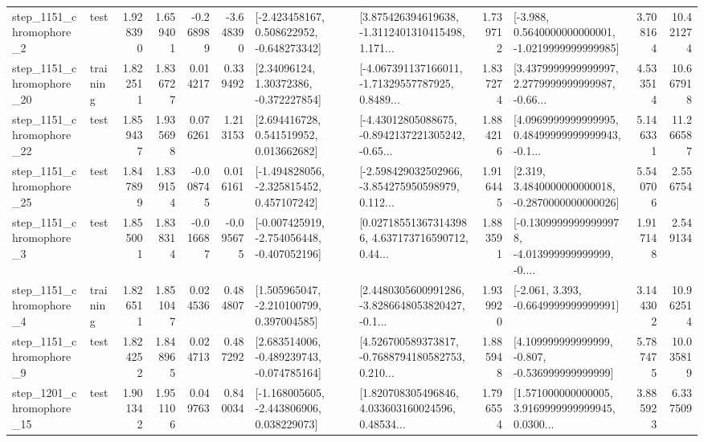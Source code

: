 \begin{tabular}{llrrrrllrlrr}
  step\_1151\_chromophore\_2 &      test &      1.928390 &    1.659401 &     -0.268989 & -3.648390 &   [-2.423458167, 0.508622952, -0.648273342] &  [3.875426394619638, -1.3112401310415498, 1.171... &       1.739712 &  [-3.988, 0.5640000000000001, -1.0219999999999985] &            3.708164 &         10.421274 \\
 step\_1151\_chromophore\_20 &  training &      1.822511 &    1.836727 &      0.014217 &  0.339492 &      [2.34096124, 1.30372386, -0.372227854] &  [-4.067391137166011, -1.71329557787925, 0.8489... &       1.837274 &  [3.4379999999999997, 2.2779999999999987, -0.66... &            4.533514 &         10.667918 \\
 step\_1151\_chromophore\_22 &      test &      1.859437 &    1.935698 &      0.076261 &  1.213153 &     [2.694416728, 0.541519952, 0.013662682] &  [-4.43012805088675, -0.8942137221305242, -0.65... &       1.884216 &  [4.0969999999999995, 0.48499999999999943, -0.1... &            5.146331 &         11.266587 \\
 step\_1151\_chromophore\_25 &      test &      1.847899 &    1.839154 &     -0.008745 &  0.016161 &   [-1.494828056, -2.325815452, 0.457107242] &  [-2.598429032502966, -3.854275950598979, 0.112... &       1.916445 &   [2.319, 3.4840000000000018, -0.2870000000000026] &            5.540706 &          2.556754 \\
  step\_1151\_chromophore\_3 &      test &      1.855001 &    1.838314 &     -0.016687 & -0.095675 &  [-0.007425919, -2.754056448, -0.407052196] &  [0.027185513673143986, 4.637173716590712, 0.44... &       1.883591 &  [-0.13099999999999978, -4.013999999999999, -0.... &            1.917148 &          2.549134 \\
  step\_1151\_chromophore\_4 &  training &      1.826511 &    1.851047 &      0.024536 &  0.484807 &    [1.505965047, -2.210100799, 0.397004585] &  [2.4480305600991286, -3.8286648053820427, -0.1... &       1.939920 &               [-2.061, 3.393, -0.6649999999999991] &            3.144302 &         10.962514 \\
  step\_1151\_chromophore\_9 &      test &      1.824252 &    1.848965 &      0.024713 &  0.487292 &   [2.683514006, -0.489239743, -0.074785164] &  [4.526700589373817, -0.7688794180582753, 0.210... &       1.885948 &    [4.109999999999999, -0.807, -0.536999999999999] &            5.787475 &         10.035819 \\
 step\_1201\_chromophore\_15 &      test &      1.901342 &    1.951106 &      0.049763 &  0.840034 &   [-1.168005605, -2.443806906, 0.038229073] &  [1.820708305496846, 4.033603160024596, 0.48534... &       1.796554 &  [1.571000000000005, 3.9169999999999945, 0.0300... &            3.885923 &          6.337509 \\

\end{tabular}
